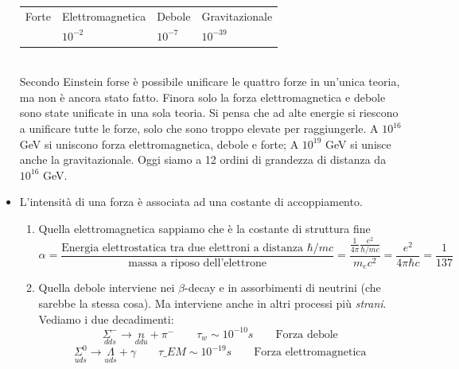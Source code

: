 \begin{itemize}
\begin{tabular}{>{\centering\arraybackslash}m{3cm} >{\centering\arraybackslash}m{3cm} >{\centering\arraybackslash}m{3cm} >{\centering\arraybackslash}m{3cm}}
        Forte & Elettromagnetica & Debole & Gravitazionale \\
        1 & $10^{-2}$    & $10^{-7}$    & $10^{-39}$    \\
    \end{tabular}\\
    Secondo Einstein forse è possibile unificare le quattro forze in un'unica teoria, ma non è ancora stato fatto. Finora solo la forza elettromagnetica e debole sono state unificate in una sola teoria. Si pensa che ad alte energie si riescono a unificare tutte le forze, solo che sono troppo elevate per raggiungerle. A $10^{16}$ GeV si uniscono forza elettromagnetica, debole e forte; A $10^{19}$ GeV si unisce anche la gravitazionale. Oggi siamo a 12 ordini di grandezza di distanza da $10^{16}$ GeV. 
    \item L'intensità di una forza è associata ad una costante di accoppiamento.
    \begin{enumerate}
        \item Quella elettromagnetica sappiamo che è la costante di struttura fine
        \begin{equation*}
            \alpha=\frac{\text{Energia elettrostatica tra due elettroni a distanza }\hbar/mc}{\text{massa a riposo dell'elettrone}}=\frac{\frac1{4\pi}\frac{e^2}{\hbar/mc}}{m_ec^2}=\frac{e^2}{4\pi\hbar c}=\frac1{137}
        \end{equation*}
        \item Quella debole interviene nei $\beta$-decay e in assorbimenti di neutrini (che sarebbe la stessa cosa). Ma interviene anche in altri processi più \textit{strani}. Vediamo i due decadimenti:
        \begin{equation*}
            \underset{dds}{\Sigma^-}\to \underset{ddu}{n}+\pi^-\qquad \tau_w\sim10^{-10}s\qquad \text{Forza debole}
        \end{equation*}
        \begin{equation*}
            \underset{uds}{\Sigma^0}\to \underset{uds}{\Lambda}+\gamma\qquad \tau\_{EM}\sim10^{-19}s\qquad \text{Forza elettromagnetica}
        \end{equation*}

\end{enumerate}
\end{itemize}
